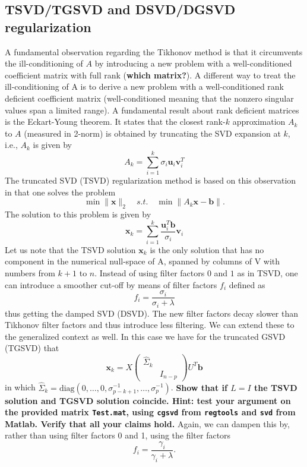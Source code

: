 \documentclass[12pt]{article}
\newcommand{\mbf}[1]{\mathbf{#1}}
\begin{document}
\subsection{TSVD/TGSVD and DSVD/DGSVD regularization}
A fundamental observation regarding the Tikhonov method is that it circumvents the ill-conditioning of $A$ by introducing a new problem with a well-conditioned coefficient matrix with full rank (\textbf{which matrix?}). A different way to treat the ill-conditioning of A is to derive a new problem with a well-conditioned rank deficient coefficient matrix (well-conditioned meaning that the nonzero singular values span a limited range). A fundamental result about rank deficient matrices is the Eckart-Young theorem. It states that the closest rank-$k$ approximation $A_k$ to $A$ (measured in 2-norm) is obtained
by truncating the SVD expansion at $k$, i.e., $A_k$ is given by
$$A_k=\sum_{i=1}^k\sigma_i\mbf{u}_i\mbf{v}_i^{T}$$
The truncated SVD (TSVD) regularization method is based on this observation in that one solves the
problem
$$\min\|\mbf{x}\|_2\quad s.t. \quad \min\|A_k\mbf{x}-\mbf{b}\|.$$
The solution to this problem is given by
$$\mbf{x}_k=\sum_{i=1}^{k}\frac{\mbf{u}_i^T\mbf{b}}{\sigma_i}\mbf{v}_i$$
Let us note that the TSVD solution $\mbf{x}_k$ is the only solution that has no component in the numerical
null-space of A, spanned by columns of V with numbers from $k + 1$ to $n$.
Instead of using filter factors $0$ and $1$ as in TSVD, one can introduce a smoother cut-off by means
of filter factors $f_i$ defined as
$$f_i=\frac{\sigma_i}{\sigma_i+\lambda}$$
thus getting the damped SVD (DSVD). The new filter factors decay slower than Tikhonov filter factors
and thus introduce less filtering.
We can extend these to the generalized context as well. In this case we have for the truncated
GSVD (TGSVD) that
$$\mbf{x}_k=X\begin{pmatrix}
\hat{\Sigma}_k&\\
&I_{n-p}
\end{pmatrix}
U^{T}\mbf{b}$$
in which $\hat{\Sigma}_k=\text{diag}(0,\ldots,0,\sigma^{-1}_{p-k+1},\ldots,\sigma^{-1}_p)$. \textbf{Show that if $L=I$ the TSVD solution and TGSVD solution coincide. Hint: test your argument on the provided matrix \texttt{Test.mat}, using \texttt{cgsvd} from \texttt{regtools} and \texttt{svd} from Matlab. Verify that all your claims hold.}
Again, we can dampen this by, rather than using filter factors 0 and 1, using the filter
factors
$$f_i=\frac{\gamma_i}{\gamma_i+\lambda}.$$
\end{document}
